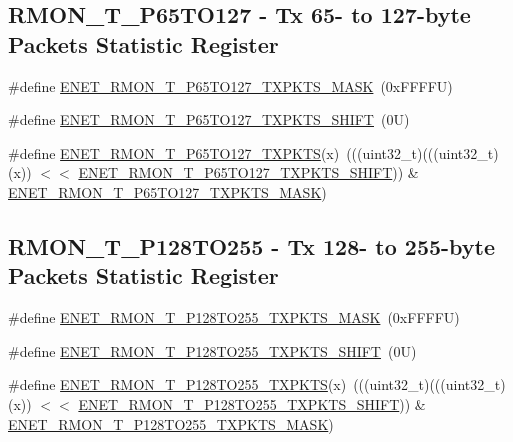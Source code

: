 \subsection*{R\+M\+O\+N\+\_\+\+T\+\_\+\+P65\+T\+O127 -\/ Tx 65-\/ to 127-\/byte Packets Statistic Register}
\begin{DoxyCompactItemize}
\item 
\#define \mbox{\hyperlink{group___e_n_e_t___register___masks_gaebb8723106917311976e5e457d535e81}{E\+N\+E\+T\+\_\+\+R\+M\+O\+N\+\_\+\+T\+\_\+\+P65\+T\+O127\+\_\+\+T\+X\+P\+K\+T\+S\+\_\+\+M\+A\+SK}}~(0x\+F\+F\+F\+F\+U)
\item 
\#define \mbox{\hyperlink{group___e_n_e_t___register___masks_ga76051106460eb4da2d6c1349785902bf}{E\+N\+E\+T\+\_\+\+R\+M\+O\+N\+\_\+\+T\+\_\+\+P65\+T\+O127\+\_\+\+T\+X\+P\+K\+T\+S\+\_\+\+S\+H\+I\+FT}}~(0\+U)
\item 
\#define \mbox{\hyperlink{group___e_n_e_t___register___masks_gaa6a23d4dd439429ea0e8393c80a1b540}{E\+N\+E\+T\+\_\+\+R\+M\+O\+N\+\_\+\+T\+\_\+\+P65\+T\+O127\+\_\+\+T\+X\+P\+K\+TS}}(x)~(((uint32\+\_\+t)(((uint32\+\_\+t)(x)) $<$$<$ \mbox{\hyperlink{group___e_n_e_t___register___masks_ga76051106460eb4da2d6c1349785902bf}{E\+N\+E\+T\+\_\+\+R\+M\+O\+N\+\_\+\+T\+\_\+\+P65\+T\+O127\+\_\+\+T\+X\+P\+K\+T\+S\+\_\+\+S\+H\+I\+FT}})) \& \mbox{\hyperlink{group___e_n_e_t___register___masks_gaebb8723106917311976e5e457d535e81}{E\+N\+E\+T\+\_\+\+R\+M\+O\+N\+\_\+\+T\+\_\+\+P65\+T\+O127\+\_\+\+T\+X\+P\+K\+T\+S\+\_\+\+M\+A\+SK}})
\end{DoxyCompactItemize}
\subsection*{R\+M\+O\+N\+\_\+\+T\+\_\+\+P128\+T\+O255 -\/ Tx 128-\/ to 255-\/byte Packets Statistic Register}
\begin{DoxyCompactItemize}
\item 
\#define \mbox{\hyperlink{group___e_n_e_t___register___masks_gacd52bd7bd4b45906ad5f62ca31f3edda}{E\+N\+E\+T\+\_\+\+R\+M\+O\+N\+\_\+\+T\+\_\+\+P128\+T\+O255\+\_\+\+T\+X\+P\+K\+T\+S\+\_\+\+M\+A\+SK}}~(0x\+F\+F\+F\+F\+U)
\item 
\#define \mbox{\hyperlink{group___e_n_e_t___register___masks_ga6ff37e25aa7ff61367f6637d29189b89}{E\+N\+E\+T\+\_\+\+R\+M\+O\+N\+\_\+\+T\+\_\+\+P128\+T\+O255\+\_\+\+T\+X\+P\+K\+T\+S\+\_\+\+S\+H\+I\+FT}}~(0\+U)
\item 
\#define \mbox{\hyperlink{group___e_n_e_t___register___masks_gac5d941cee86d2827cbbb7a52cbb771dd}{E\+N\+E\+T\+\_\+\+R\+M\+O\+N\+\_\+\+T\+\_\+\+P128\+T\+O255\+\_\+\+T\+X\+P\+K\+TS}}(x)~(((uint32\+\_\+t)(((uint32\+\_\+t)(x)) $<$$<$ \mbox{\hyperlink{group___e_n_e_t___register___masks_ga6ff37e25aa7ff61367f6637d29189b89}{E\+N\+E\+T\+\_\+\+R\+M\+O\+N\+\_\+\+T\+\_\+\+P128\+T\+O255\+\_\+\+T\+X\+P\+K\+T\+S\+\_\+\+S\+H\+I\+FT}})) \& \mbox{\hyperlink{group___e_n_e_t___register___masks_gacd52bd7bd4b45906ad5f62ca31f3edda}{E\+N\+E\+T\+\_\+\+R\+M\+O\+N\+\_\+\+T\+\_\+\+P128\+T\+O255\+\_\+\+T\+X\+P\+K\+T\+S\+\_\+\+M\+A\+SK}})
\end{DoxyCompactItemize}
